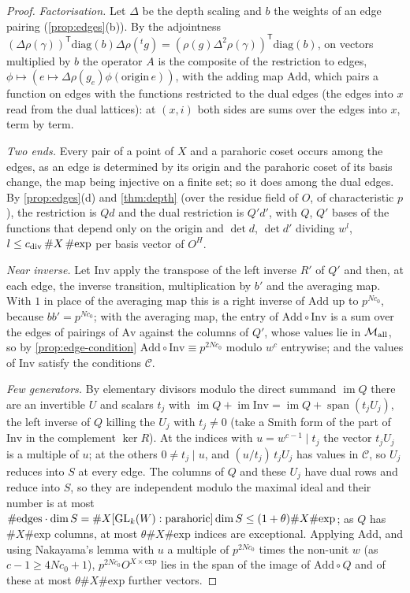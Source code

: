 \begin{proof}
\emph{Factorisation.} Let $\Delta$ be the depth scaling and $b$ the weights of an edge pairing (\cref{prop:edges}(b)). By the adjointness $(\Delta\rho(\gamma))^{\mathsf T}\mathrm{diag}(b)\Delta\rho({}^tg)=(\rho(g)\Delta^2\rho(\gamma))^{\mathsf T}\mathrm{diag}(b)$, on vectors multiplied by $b$ the operator $A$ is the composite of the restriction to edges, $\phi\mapsto(e\mapsto\Delta\rho(g_e)\phi(\mathrm{origin}\,e))$, with the adding map $\mathrm{Add}$, which pairs a function on
edges with the functions restricted to the dual edges (the edges into $x$ read from the dual lattices): at $(x,i)$ both sides are sums over the edges into $x$, term by term.

\emph{Two ends.} Every pair of a point of $X$ and a parahoric coset occurs among the edges, as an edge is determined by its origin and the parahoric coset of its basis change, the map being injective on a finite set; so it does among the dual edges. By \cref{prop:edges}(d) and \cref{thm:depth} (over the residue field of $O$, of characteristic $p$), the restriction is $Qd$ and the dual
restriction is $Q'd'$, with $Q$, $Q'$ bases of the functions that depend only on the origin and $\det d$, $\det d'$ dividing $w^{l}$, $l\le c_{\rm div}\,\#X\,\#\mathrm{exp}$ per basis vector of $O^H$.

\emph{Near inverse.} Let $\mathrm{Inv}$ apply the transpose of the left inverse $R'$ of $Q'$ and then, at each edge, the inverse transition, multiplication by $b'$ and the averaging map. With $1$ in place of the averaging map this is a right inverse of $\mathrm{Add}$ up to $p^{Nc_0}$, because $bb'=p^{Nc_0}$; with the averaging map, the entry of $\mathrm{Add}\circ\mathrm{Inv}$ is a sum over the edges of pairings of $\mathrm{Av}$ against the
columns of $Q'$, whose values lie in $\mathcal M_{\rm all}$, so by \cref{prop:edge-condition} $\mathrm{Add}\circ\mathrm{Inv}\equiv p^{2Nc_0}$ modulo $w^c$ entrywise; and the values of $\mathrm{Inv}$ satisfy the conditions $\mathcal C$.

\emph{Few generators.} By elementary divisors modulo the direct summand $\operatorname{im}Q$ there are an invertible $U$ and scalars $t_j$ with $\operatorname{im}Q+\operatorname{im}\mathrm{Inv}=\operatorname{im}Q+\operatorname{span}(t_jU_j)$, the left inverse of $Q$ killing the $U_j$ with $t_j\ne0$ (take a Smith form of the part of $\mathrm{Inv}$ in the complement $\ker R$). At the indices with $u=w^{c-1}\mid t_j$ the vector $t_jU_j$ is a
multiple of $u$; at the others $0\ne t_j\mid u$, and $(u/t_j)\,t_jU_j$ has values in $\mathcal C$, so $U_j$ reduces into $S$ at every edge. The columns of $Q$ and these $U_j$ have dual rows and reduce into $S$, so they are independent modulo the maximal ideal and their number is at most $\#\text{edges}\cdot\dim S=\#X[\operatorname{GL}_k(W):\text{parahoric}]\dim S\le(1+\theta)\#X\#\mathrm{exp}$; as $Q$ has $\#X\#\mathrm{exp}$
columns, at most $\theta\#X\#\mathrm{exp}$ indices are exceptional. Applying $\mathrm{Add}$, and using Nakayama's lemma with $u$ a multiple of $p^{2Nc_0}$ times the non-unit $w$ (as $c-1\ge4Nc_0+1$), $p^{2Nc_0}O^{X\times\mathrm{exp}}$ lies in the span of the image of $\mathrm{Add}\circ Q$ and of these at most $\theta\#X\#\mathrm{exp}$ further vectors.


\end{proof}
